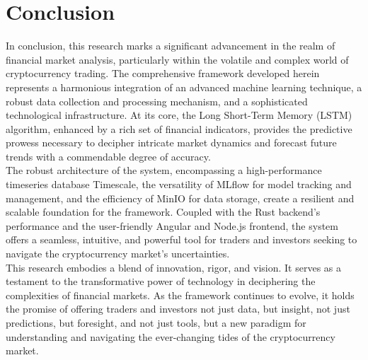 \chapter{Conclusion}

In conclusion, this research marks a significant advancement in the realm of financial market analysis, particularly within the volatile and complex world of cryptocurrency trading. The comprehensive framework developed herein represents a harmonious integration of an advanced machine learning technique, a robust data collection and processing mechanism, and a sophisticated technological infrastructure. At its core, the Long Short-Term Memory (LSTM) algorithm, enhanced by a rich set of financial indicators, provides the predictive prowess necessary to decipher intricate market dynamics and forecast future trends with a commendable degree of accuracy. \\

The robust architecture of the system, encompassing a high-performance timeseries database Timescale, the versatility of MLflow for model tracking and management, and the efficiency of MinIO for data storage, create a resilient and scalable foundation for the framework. Coupled with the Rust backend's performance and the user-friendly Angular and Node.js frontend, the system offers a seamless, intuitive, and powerful tool for traders and investors seeking to navigate the cryptocurrency market's uncertainties. \\ 

This research embodies a blend of innovation, rigor, and vision. It serves as a testament to the transformative power of technology in deciphering the complexities of financial markets. As the framework continues to evolve, it holds the promise of offering traders and investors not just data, but insight, not just predictions, but foresight, and not just tools, but a new paradigm for understanding and navigating the ever-changing tides of the cryptocurrency market. \\
